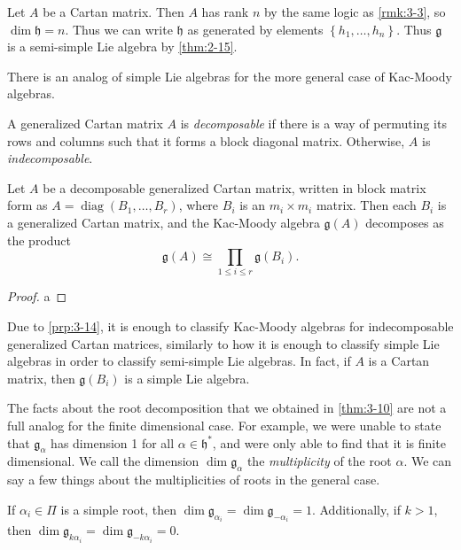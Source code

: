 \documentclass[11pt, letterpaper]{article}
\theoremstyle{plain}
\begin{document}
\begin{example}\label{ex:3-12}
	Let $A$ be a Cartan matrix. Then $A$ has rank $n$ by the same logic as \cref{rmk:3-3}, so $\dim \mathfrak{h} =n$. Thus we can write $\mathfrak{h} $ as generated by elements $\left\{ h_1, \ldots ,h_n \right\} $. Thus $\mathfrak{g} $ is a semi-simple Lie algebra by \cref{thm:2-15}.
\end{example}

There is an analog of simple Lie algebras for the more general case of Kac-Moody algebras.

\begin{definition}\label{dfn:3-13}
	A generalized Cartan matrix $A$ is \emph{decomposable} if there is a way of permuting its rows and columns such that it forms a block diagonal matrix. Otherwise, $A$ is \emph{indecomposable}.
\end{definition}
\begin{proposition}\label{prp:3-14}
	Let $A$ be a decomposable generalized Cartan matrix, written in block matrix form as $A = \operatorname{diag} (B_1, \ldots , B_r)$, where $B_i$ is an $m_i \times m_i$ matrix. Then each $B_i$ is a generalized Cartan matrix, and the Kac-Moody algebra $\mathfrak{g} (A)$ decomposes as the product
	\[
		\mathfrak{g}(A) \cong \prod_{1\leq i\leq r} \mathfrak{g} (B_i)
	.\]
\end{proposition}
\begin{proof}
	a
\end{proof}

\begin{remark}\label{rmk:3-15}
	Due to \cref{prp:3-14}, it is enough to classify Kac-Moody algebras for indecomposable generalized Cartan matrices, similarly to how it is enough to classify simple Lie algebras in order to classify semi-simple Lie algebras. In fact, if $A$ is a Cartan matrix, then $\mathfrak{g} (B_i)$ is a simple Lie algebra.
\end{remark}

The facts about the root decomposition that we obtained in \cref{thm:3-10} are not a full analog for the finite dimensional case. For example, we were unable to state that $\mathfrak{g} _{\alpha } $ has dimension 1 for all $\alpha \in \mathfrak{h} ^*$, and were only able to find that it is finite dimensional. We call the dimension $\dim \mathfrak{g} _{\alpha } $ the \emph{multiplicity} of the root $\alpha $. We can say a few things about the multiplicities of roots in the general case.

\begin{proposition}\label{prp:3-16}
	If $\alpha _i\in \Pi $ is a simple root, then $\dim \mathfrak{g} _{\alpha _i} =\dim \mathfrak{g} _{-\alpha _i} =1$. Additionally, if $k>1$, then $\dim \mathfrak{g} _{k\alpha _i} =\dim \mathfrak{g} _{-k\alpha _i} =0$.
\end{proposition}
\end{document}
